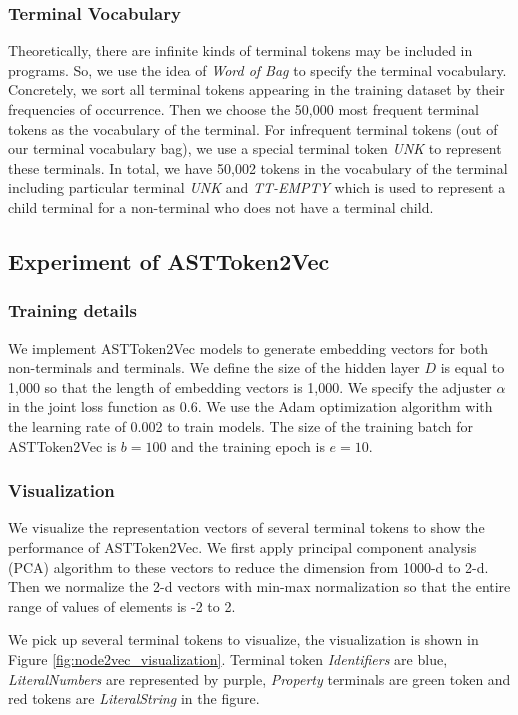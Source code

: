 \documentclass[E]{compsoft}
\begin{document}
\subsubsection{Terminal Vocabulary} 
Theoretically, there are infinite kinds of terminal tokens may be included in programs.
So, we use the idea of \textit{Word of Bag} to specify the terminal vocabulary. 
Concretely, we sort all terminal tokens appearing in the training dataset by their frequencies of occurrence. 
Then we choose the 50,000 most frequent terminal tokens as the vocabulary of the terminal. 
For infrequent terminal tokens (out of our terminal vocabulary bag), we use a special terminal token \textit{UNK} to represent these terminals. 
In total, we have 50,002 tokens in the vocabulary of the terminal including particular terminal \textit{UNK} and \textit{TT-EMPTY} which is used to represent a child terminal for a non-terminal who does not have a terminal child. 



\subsection{Experiment of ASTToken2Vec}
\subsubsection{Training details}
We implement ASTToken2Vec models to generate embedding vectors for both non-terminals and terminals. We define the size of the hidden layer $D$ is equal to 1,000 so that the length of embedding vectors is 1,000. 
We specify the adjuster $\alpha$ in the joint loss function as 0.6.
We use the Adam optimization algorithm with the learning rate of 0.002 to train models. 
The size of the training batch for ASTToken2Vec is $b=100$ and the training epoch is $e=10$.

\subsubsection{Visualization}
We visualize the representation vectors of several terminal tokens to show the performance of ASTToken2Vec.
We first apply principal component analysis (PCA) algorithm to these vectors to reduce the dimension from 1000-d to 2-d. 
Then we normalize the 2-d vectors with min-max normalization so that the entire range of values of elements is -2 to 2.

We pick up several terminal tokens to visualize, the visualization is shown in Figure \ref{fig:node2vec_visualization}. 
Terminal token \textit{Identifiers} are blue, \textit{LiteralNumbers} are represented by purple, \textit{Property} terminals are green token and red tokens are \textit{LiteralString} in the figure.
\end{document}
